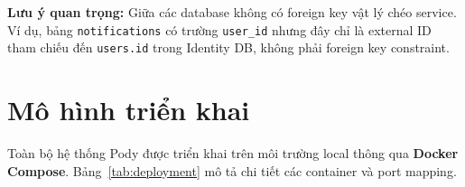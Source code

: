 \documentclass[14pt,a4paper,oneside]{extreport}
\begin{document}
\noindent
\textbf{Lưu ý quan trọng:} Giữa các database không có foreign key vật lý chéo service. Ví dụ, bảng \texttt{notifications} có trường \texttt{user\_id} nhưng đây chỉ là external ID tham chiếu đến \texttt{users.id} trong Identity DB, không phải foreign key constraint.


\section{Mô hình triển khai}
\label{sec:trien-khai}

Toàn bộ hệ thống Pody được triển khai trên môi trường local thông qua \textbf{Docker Compose}. Bảng~\ref{tab:deployment} mô tả chi tiết các container và port mapping.
\end{document}
